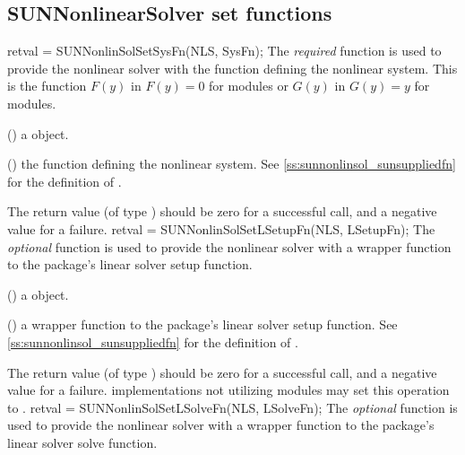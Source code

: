 \subsection{SUNNonlinearSolver set functions}
\label{ss:sunnonlinsol_setfn}
{
  retval = SUNNonlinSolSetSysFn(NLS, SysFn);
}
{
  The \textit{required} function  is used
  to provide the nonlinear solver with the function defining the
  nonlinear system. This is the function $F(y)$ in $F(y)=0$ for
   modules or $G(y)$ in $G(y)=y$ for
   modules.
}
{
  \begin{args}[SysFn]
  \item[NLS] ()
    a {\sunnonlinsol} object.
  \item[SysFn] ()
    the function defining the nonlinear system. See
    \ref{ss:sunnonlinsol_sunsuppliedfn} for the definition of
    .
  \end{args}
}
{
  The return value  (of type ) should be zero for a
  successful call, and a negative value for a failure.
}
{}
{
  retval = SUNNonlinSolSetLSetupFn(NLS, LSetupFn);
}
{
  The \textit{optional} function  is used to
  provide the nonlinear solver with a wrapper function to the
  {\sundials} package's linear solver setup function.
}
{
  \begin{args}[LSetupFn]
  \item[NLS] ()
    a {\sunnonlinsol} object.
  \item[LSetupFn] ()
    a wrapper function to the {\sundials} package's linear solver
    setup function. See \ref{ss:sunnonlinsol_sunsuppliedfn} for the
    definition of .
  \end{args}
}
{
  The return value  (of type ) should be zero for a
  successful call, and a negative value for a failure.
}
{
  {\sunnonlinsol} implementations not utilizing {\sunlinsol} modules
  may set this operation to .
}
{
  retval = SUNNonlinSolSetLSolveFn(NLS, LSolveFn);
}
{
  The \textit{optional} function  is used
  to provide the nonlinear solver with a wrapper function to the
  {\sundials} package's linear solver solve function.
}
